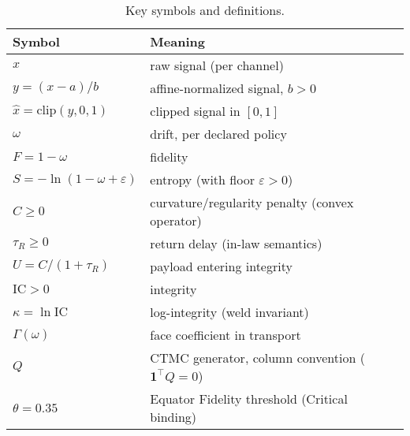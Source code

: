 
\begin{table}[h]
\caption{Key symbols and definitions.}
\begin{tabular}{ll}
\toprule
Symbol & Meaning \\
\midrule
$x$ & raw signal (per channel) \\
$y=(x-a)/b$ & affine-normalized signal, $b>0$ \\
$\hat x=\mathrm{clip}(y,0,1)$ & clipped signal in $[0,1]$ \\
$\omega$ & drift, per declared policy \\
$F=1-\omega$ & fidelity \\
$S=-\ln(1-\omega+\varepsilon)$ & entropy (with floor $\varepsilon>0$) \\
$C\ge 0$ & curvature/regularity penalty (convex operator) \\
$\tau_R\ge 0$ & return delay (in-law semantics) \\
$U=C/(1+\tau_R)$ & payload entering integrity \\
$\mathrm{IC}>0$ & integrity \\
$\kappa=\ln \mathrm{IC}$ & log-integrity (weld invariant) \\
$\Gamma(\omega)$ & face coefficient in transport \\
$Q$ & CTMC generator, column convention ($\mathbf{1}^\top Q=0$) \\
$\theta=0.35$ & Equator Fidelity threshold (Critical binding) \\
\bottomrule
\end{tabular}
\end{table}
